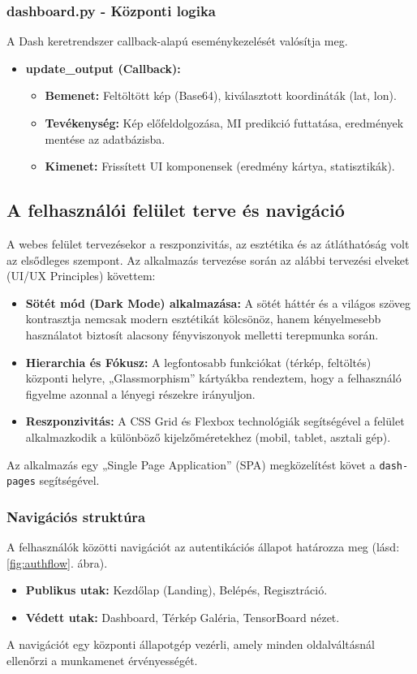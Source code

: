 \documentclass[
	parspace, %
]{elteikthesis}[2024/04/26]
\begin{document}
\subsubsection{dashboard.py - Központi logika}
A Dash keretrendszer callback-alapú eseménykezelését valósítja meg.
\begin{itemize}
    \item \textbf{update\_output (Callback):}
    \begin{itemize}
        \item \textbf{Bemenet:} Feltöltött kép (Base64), kiválasztott koordináták (lat, lon).
        \item \textbf{Tevékenység:} Kép előfeldolgozása, MI predikció futtatása, eredmények mentése az adatbázisba.
        \item \textbf{Kimenet:} Frissített UI komponensek (eredmény kártya, statisztikák).
    \end{itemize}
\end{itemize}

\subsection{A felhasználói felület terve és navigáció}
A webes felület tervezésekor a reszponzivitás, az esztétika és az átláthatóság volt az elsődleges szempont. Az alkalmazás tervezése során az alábbi tervezési elveket (UI/UX Principles) követtem:
\begin{itemize}
    \item \textbf{Sötét mód (Dark Mode) alkalmazása:} A sötét háttér és a világos szöveg kontrasztja nemcsak modern esztétikát kölcsönöz, hanem kényelmesebb használatot biztosít alacsony fényviszonyok melletti terepmunka során.
    \item \textbf{Hierarchia és Fókusz:} A legfontosabb funkciókat (térkép, feltöltés) központi helyre, „Glassmorphism” kártyákba rendeztem, hogy a felhasználó figyelme azonnal a lényegi részekre irányuljon.
    \item \textbf{Reszponzivitás:} A CSS Grid és Flexbox technológiák segítségével a felület alkalmazkodik a különböző kijelzőméretekhez (mobil, tablet, asztali gép).
\end{itemize}

Az alkalmazás egy „Single Page Application” (SPA) megközelítést követ a \texttt{dash-pages} segítségével.

\subsubsection{Navigációs struktúra}
A felhasználók közötti navigációt az autentikációs állapot határozza meg (lásd: \ref{fig:authflow}. ábra).
\begin{itemize}
    \item \textbf{Publikus utak:} Kezdőlap (Landing), Belépés, Regisztráció.
    \item \textbf{Védett utak:} Dashboard, Térkép Galéria, TensorBoard nézet.
\end{itemize}
A navigációt egy központi állapotgép vezérli, amely minden oldalváltásnál ellenőrzi a munkamenet érvényességét.
\end{document}

